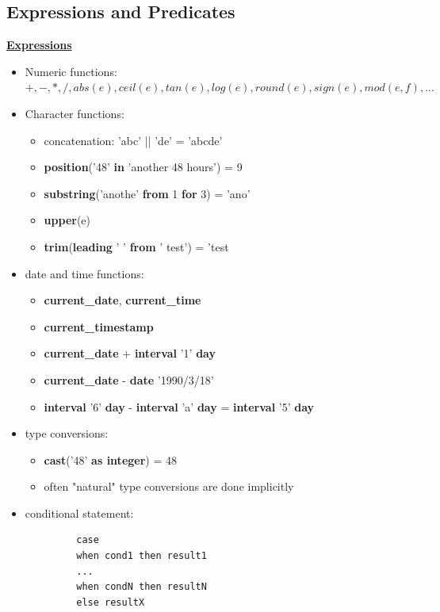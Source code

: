 \subsection{Expressions and Predicates}
\textbf{\underline{Expressions}}
\bigskip

\begin{itemize}
    \item Numeric functions: $+,-,*,/, abs(e), ceil(e), tan(e), log(e), round(e), sign(e), mod(e,f),...$
    \item Character functions:
    \begin{itemize}
        \item concatenation: 'abc' || 'de' = 'abcde'
        \item \textbf{position}('48' \textbf{in} 'another 48 hours') = 9
        \item \textbf{substring}('anothe' \textbf{from} 1 \textbf{for} 3) = 'ano'
        \item \textbf{upper}(e)
        \item \textbf{trim}(\textbf{leading} ' ' \textbf{from} ' test') = 'test
    \end{itemize}
    \item date and time functions:
    \begin{itemize}
        \item \textbf{current\_date}, \textbf{current\_time}
        \item \textbf{current\_timestamp}
        \item \textbf{current\_date} + \textbf{interval} '1' \textbf{day}
        \item \textbf{current\_date} - \textbf{date} '1990/3/18'
        \item \textbf{interval} '6' \textbf{day} - \textbf{interval} 'a' \textbf{day} = \textbf{interval} '5' \textbf{day}
     \end{itemize}
     \item type conversions:
     \begin{itemize}
         \item \textbf{cast}('48' \textbf{as integer}) = 48
         \item often "natural" type conversions are done implicitly
     \end{itemize}
     \item conditional statement:
     \begin{lstlisting}
         case
         when cond1 then result1
         ...
         when condN then resultN
         else resultX

\end{lstlisting}
\end{itemize}
